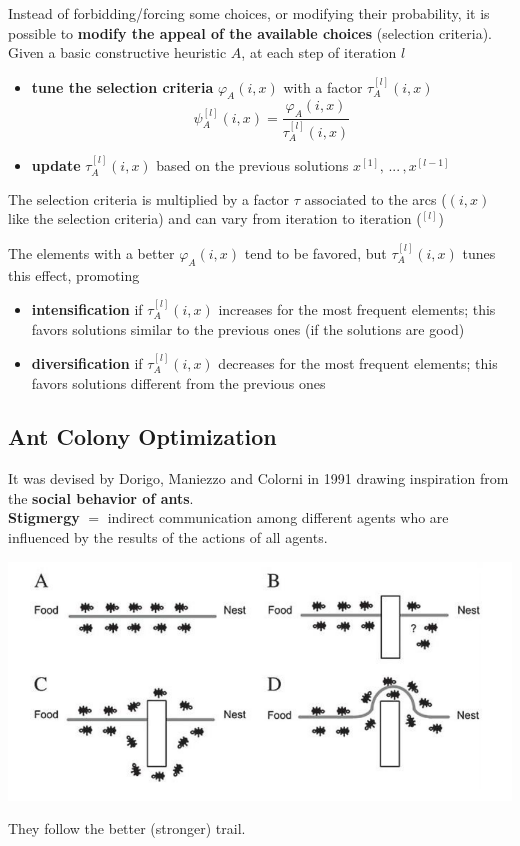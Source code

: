 \documentclass[11pt]{article}
\begin{document}
	Instead of forbidding/forcing some choices, or modifying their probability, it is possible to \textbf{modify the appeal of the available choices} (selection criteria).\\
	
	Given a basic constructive heuristic $A$, at each step of iteration $l$
	\begin{itemize}
		\item \textbf{tune the selection criteria} $\varphi_A (i, x)$ with a factor $\tau_A^{[l]} (i, x)$
		$$ \psi_A^{[l]} (i,x) = \frac{\varphi_A (i,x)}{\tau_A^{[l]} (i, x)} $$
		
		\item \textbf{update} $\tau_A^{[l]} (i, x)$ based on the previous solutions $x^{[1]}, \, ... \, , x^{[l−1]}$
	\end{itemize}
	The selection criteria is multiplied by a factor $\tau$ associated to the arcs ($(i,x)$ like the selection criteria) and can vary from iteration to iteration ($^{[l]}$)
	
	The elements with a better $\varphi_A (i, x)$ tend to be favored, but $\tau_A^{[l]} (i, x)$ tunes this effect, promoting
	\begin{itemize}
		\item \textbf{intensification} if $\tau_A^{[l]} (i, x)$ increases for the most frequent elements; this favors solutions similar to the previous ones (if the solutions are good)
		
		\item \textbf{diversification} if $\tau_A^{[l]} (i, x)$ decreases for the most frequent elements; this favors solutions different from the previous ones
	\end{itemize}
	
	\newpage
	
	\subsection{Ant Colony Optimization}

	It was devised by Dorigo, Maniezzo and Colorni in 1991 drawing inspiration from the \textbf{social behavior of ants}.\\
	
	\textbf{Stigmergy} $=$ indirect communication among different agents who are influenced by the results of the actions of all agents.
	
	\begin{center}
		\includegraphics[width=0.7\columnwidth]{img/ants}
	\end{center}
	They follow the better (stronger) trail.\\
	
\end{document}
